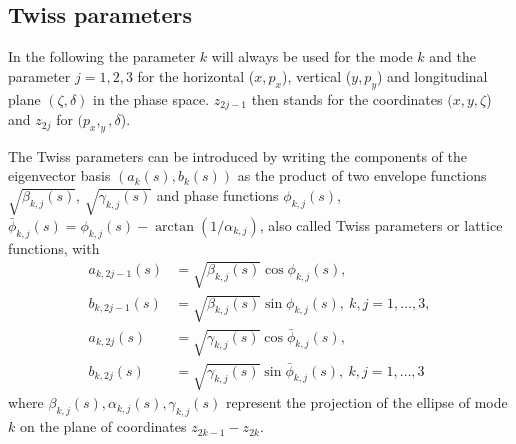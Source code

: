 \subsection{Twiss parameters}
\label{opt:sec:4}
In the following the parameter $k$ will always be used for the mode $k$ and the parameter
$j=1,2,3$ for the horizontal ($x,p_x$), vertical ($y,p_y$) and longitudinal plane
$(\zeta,\delta)$ in the phase space. $z_{2j-1}$ then stands for the coordinates $(x,y,\zeta$)
and $z_{2j}$ for $(p_x,_y,\delta$).

The Twiss parameters can be introduced by writing the components of the eigenvector basis
$(a_k(s),b_k(s))$ as the product of two envelope functions $\sqrt{\beta_{k,j}(s)}$,
$\sqrt{\gamma_{k,j}(s)}$ and phase functions $\phi_{k,j}(s)$, $\bar\phi_{k,j}(s) = \phi_{k,j}(s) - \arctan(1/\alpha_{k,j})$,
also called Twiss parameters or lattice functions, with
\begin{align}
a_{k,2j-1}(s)&=\sqrt{\beta_{k,j}(s)}\cos{\phi_{k,j}(s)},\nonumber\\ b_{k,2j-1}(s)&=\sqrt{\beta_{k,j}(s)}\sin{\phi_{k,j}(s)}, \ k,j=1,\ldots,3, \label{opt:eqn:4:1}\\
a_{k,2j}(s)&=\sqrt{\gamma_{k,j}(s)}\cos{\bar\phi_{k,j}(s)}, \nonumber\\
b_{k,2j}(s)&=\sqrt{\gamma_{k,j}(s)}\sin{\bar\phi_{k,j}(s)}, \ k,j=1,\ldots,3 \label{opt:eqn:4:2}
\end{align}
where $\beta_{k,j}(s), \alpha_{k,j}(s), \gamma_{k,j}(s)$ represent the projection of the ellipse of mode $k$ on the plane of coordinates $z_{2k-1}-z_{2k}$. 

